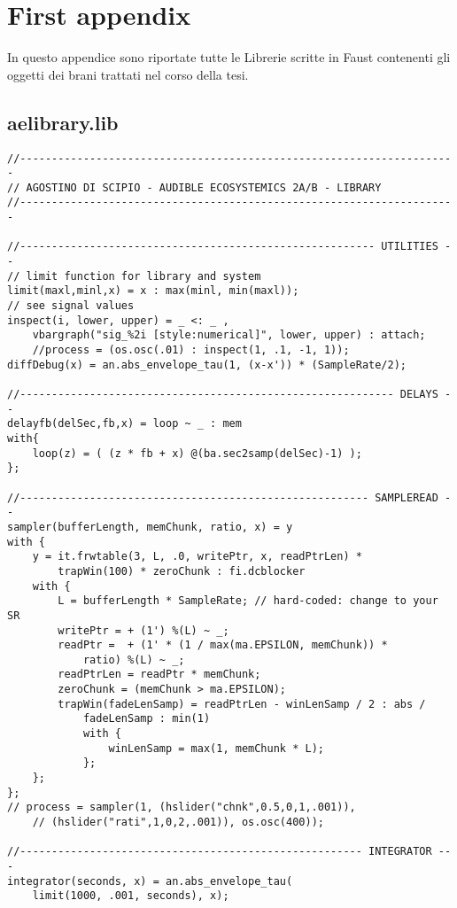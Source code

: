 \section{First appendix}

In questo appendice sono riportate tutte le Librerie
scritte in Faust contenenti gli oggetti dei brani trattati
nel corso della tesi.

\subsection{aelibrary.lib}

\vspace{0.5cm}
\begin{lstlisting}
//---------------------------------------------------------------------
// AGOSTINO DI SCIPIO - AUDIBLE ECOSYSTEMICS 2A/B - LIBRARY
//---------------------------------------------------------------------

//-------------------------------------------------------- UTILITIES --
// limit function for library and system
limit(maxl,minl,x) = x : max(minl, min(maxl));
// see signal values 
inspect(i, lower, upper) = _ <: _ , 
    vbargraph("sig_%2i [style:numerical]", lower, upper) : attach;
    //process = (os.osc(.01) : inspect(1, .1, -1, 1));
diffDebug(x) = an.abs_envelope_tau(1, (x-x')) * (SampleRate/2);

//----------------------------------------------------------- DELAYS --
delayfb(delSec,fb,x) = loop ~ _ : mem
with{ 
    loop(z) = ( (z * fb + x) @(ba.sec2samp(delSec)-1) );
};

//------------------------------------------------------- SAMPLEREAD --
sampler(bufferLength, memChunk, ratio, x) = y
with {
    y = it.frwtable(3, L, .0, writePtr, x, readPtrLen) * 
        trapWin(100) * zeroChunk : fi.dcblocker
    with {
        L = bufferLength * SampleRate; // hard-coded: change to your SR
        writePtr = + (1') %(L) ~ _;
        readPtr =  + (1' * (1 / max(ma.EPSILON, memChunk)) * 
            ratio) %(L) ~ _;
        readPtrLen = readPtr * memChunk;
        zeroChunk = (memChunk > ma.EPSILON);
        trapWin(fadeLenSamp) = readPtrLen - winLenSamp / 2 : abs / 
            fadeLenSamp : min(1)
            with {
                winLenSamp = max(1, memChunk * L);
            };
    };
};
// process = sampler(1, (hslider("chnk",0.5,0,1,.001)), 
    // (hslider("rati",1,0,2,.001)), os.osc(400));

//------------------------------------------------------ INTEGRATOR ---
integrator(seconds, x) = an.abs_envelope_tau(
    limit(1000, .001, seconds), x);


\end{lstlisting}
